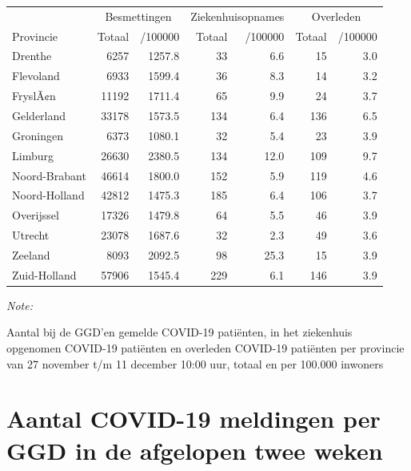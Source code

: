 \documentclass[
  english,
  man,floatsintext]{apa6}
\begin{document}
\begin{table}
\centering
\begin{threeparttable}
\begin{tabular}{lrrrrrr}
\toprule
\multicolumn{1}{c}{ } & \multicolumn{2}{c}{Besmettingen} & \multicolumn{2}{c}{Ziekenhuisopnames} & \multicolumn{2}{c}{Overleden} \\
\cmidrule(l{3pt}r{3pt}){2-3} \cmidrule(l{3pt}r{3pt}){4-5} \cmidrule(l{3pt}r{3pt}){6-7}
Provincie & Totaal & /100000 & Totaal & /100000 & Totaal & /100000\\
\midrule
Drenthe & 6257 & 1257.8 & 33 & 6.6 & 15 & 3.0\\
Flevoland & 6933 & 1599.4 & 36 & 8.3 & 14 & 3.2\\
FryslÃ¢n & 11192 & 1711.4 & 65 & 9.9 & 24 & 3.7\\
Gelderland & 33178 & 1573.5 & 134 & 6.4 & 136 & 6.5\\
Groningen & 6373 & 1080.1 & 32 & 5.4 & 23 & 3.9\\
Limburg & 26630 & 2380.5 & 134 & 12.0 & 109 & 9.7\\
Noord-Brabant & 46614 & 1800.0 & 152 & 5.9 & 119 & 4.6\\
Noord-Holland & 42812 & 1475.3 & 185 & 6.4 & 106 & 3.7\\
Overijssel & 17326 & 1479.8 & 64 & 5.5 & 46 & 3.9\\
Utrecht & 23078 & 1687.6 & 32 & 2.3 & 49 & 3.6\\
Zeeland & 8093 & 2092.5 & 98 & 25.3 & 15 & 3.9\\
Zuid-Holland & 57906 & 1545.4 & 229 & 6.1 & 146 & 3.9\\
\bottomrule
\end{tabular}
\begin{tablenotes}
\item \textit{Note: } 
\item Aantal bij de GGD’en gemelde COVID-19 patiënten, in het ziekenhuis opgenomen COVID-19 patiënten en overleden COVID-19 patiënten per provincie van 27 november t/m 11 december 10:00 uur, totaal en per 100.000 inwoners
\end{tablenotes}
\end{threeparttable}
\end{table}

\newpage

\hypertarget{aantal-covid-19-meldingen-per-ggd-in-de-afgelopen-twee-weken}{%
\section{Aantal COVID-19 meldingen per GGD in de afgelopen twee weken}\label{aantal-covid-19-meldingen-per-ggd-in-de-afgelopen-twee-weken}}
\end{document}
